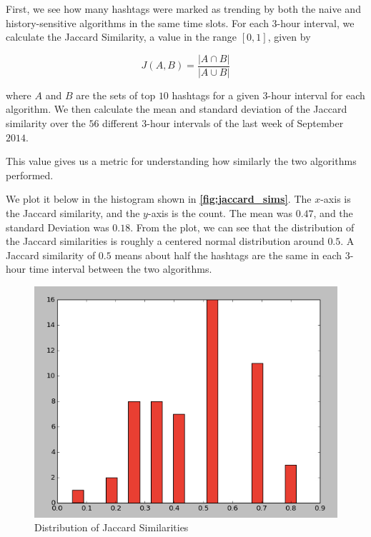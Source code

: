 \documentclass[twoside]{article}
\newcommand{\aref}[1]
 {\textbf{\autoref{#1}}}
\begin{document}
First, we see how many hashtags were marked as trending 
by both the naive and history-sensitive algorithms in the same time slots.
For each $3$-hour interval, we calculate the Jaccard Similarity, a value
in the range $[0, 1]$, given by 

\begin{equation}
\label{eq:jaccard}
J(A, B) = \frac{|A \cap B|}{|A \cup B|}
\end{equation}

\noindent where $A$ and $B$ are the sets of top $10$ hashtags for a given $3$-hour interval
for each algorithm. 
We then calculate the mean and standard deviation of the Jaccard similarity
over the $56$ different $3$-hour intervals of the last week of September $2014$.

This value gives us a metric for understanding how similarly the two algorithms performed.

We plot it below in the histogram shown in \aref{fig:jaccard_sims}. The $x$-axis is the Jaccard similarity, and the $y$-axis is the count. The mean was $0.47$, and the standard Deviation was $0.18$. From the plot, we can see that the distribution of the Jaccard similarities is roughly a centered normal distribution around $0.5$. A Jaccard similarity of $0.5$ means about half the hashtags are the same in each $3$-hour time interval between the two algorithms. 

\begin{figure}
\centering
\includegraphics[scale = .4]{jaccard_sims}
\caption{Distribution of Jaccard Similarities}
\label{fig:jaccard_sims}
\end{figure}
\end{document}
